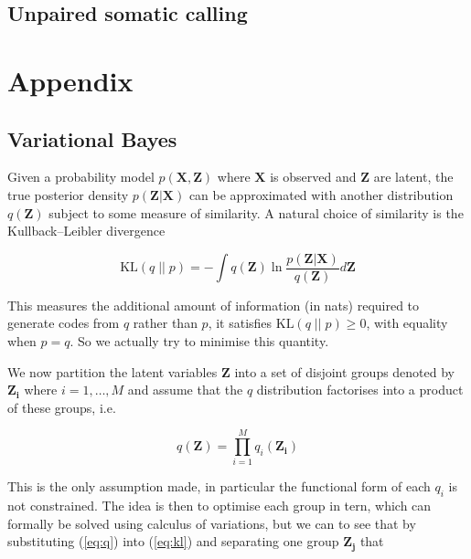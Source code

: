 \documentclass{article}
\begin{document}
\subsection{Unpaired somatic calling}

\section{Appendix}

\subsection{Variational Bayes}

Given a probability model $p(\boldsymbol{X}, \boldsymbol{Z})$ where $\boldsymbol{X}$ is observed and $\boldsymbol{Z}$ are latent, the true posterior density $p(\boldsymbol{Z} | \boldsymbol{X})$ can be approximated with another distribution $q(\boldsymbol{Z})$ subject to some measure of similarity. A natural choice of similarity is the Kullback–Leibler divergence

\begin{equation}
\label{eq:kl}
   \text{KL} (q\; ||\; p) = -\int q(\boldsymbol{Z}) \ln \frac{p(\boldsymbol{Z} | \boldsymbol{X})}{q(\boldsymbol{Z})} d\boldsymbol{Z}
\end{equation}

This measures the additional amount of information (in nats) required to generate codes from $q$ rather than $p$, it satisfies $\text{KL}(q\; ||\; p) \ge 0$, with equality when $p = q$. So we actually try to minimise this quantity.

We now partition the latent variables $\boldsymbol{Z}$ into a set of disjoint groups denoted by $\boldsymbol{Z_i}$ where $i = 1, \dots, M$ and assume that the $q$ distribution factorises into a product of these groups, i.e.

\begin{equation}
\label{eq:q}
  q(\boldsymbol{Z}) = \prod_{i = 1}^M q_i(\boldsymbol{Z_i})
\end{equation}

This is the only assumption made, in particular the functional form of each $q_i$ is not constrained. The idea is then to optimise each group in tern, which can formally be solved using calculus of variations, but we can to see that by substituting (\ref{eq:q}) into (\ref{eq:kl}) and separating one group $\boldsymbol{Z_j}$ that
\end{document}
